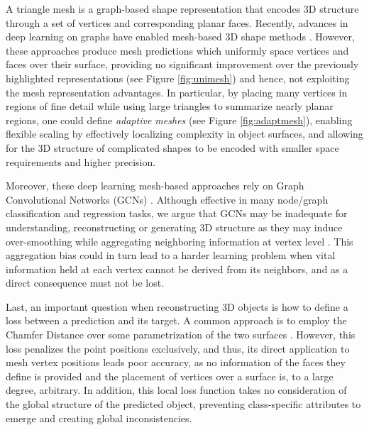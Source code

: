 \documentclass{article}
\begin{document}
A triangle mesh is a graph-based shape representation that encodes 3D structure through a set of vertices and corresponding planar faces. Recently, advances in deep learning on graphs have enabled mesh-based 3D shape methods \cite{kato2017neural, Pixel2Mesh, kanazawa2018learning, jack2018learning, henderson2018learning, groueix20183d}. However, these approaches produce mesh predictions which uniformly space vertices and faces over their surface, providing no significant improvement over the previously highlighted representations (see Figure \ref{fig:unimesh}) and hence, not exploiting the mesh representation advantages. In particular, by placing many vertices in regions of fine detail while using large triangles to summarize nearly planar regions, one could define \emph{adaptive meshes} (see Figure \ref{fig:adaptmesh}), enabling flexible scaling by effectively localizing complexity in object surfaces, and allowing for the 3D structure of complicated shapes to be encoded with smaller space requirements and higher precision.  


Moreover, these deep learning mesh-based approaches rely on Graph Convolutional Networks (GCNs) \cite{GCN,Defferrard:2016:CNN:3157382.3157527,Cucurull2018ConvolutionalNN,Pixel2Mesh}. Although effective in many node/graph classification and regression tasks, we argue that GCNs may be inadequate for understanding, reconstructing or generating 3D structure as they may induce over-smoothing while aggregating neighboring information at vertex level \cite{Li2018DeeperII}. This aggregation bias could in turn lead to a harder learning problem when vital information held at each vertex cannot be derived from its neighbors, and as a direct consequence must not be lost. 

Last, an important question when reconstructing 3D objects is how to define a loss between a prediction and its target. A common approach is to employ the Chamfer Distance over some parametrization of the two surfaces \cite{Barrow:1977:PCC:1622943.1622971, insafutdinov2018unsupervised,Pixel2Mesh, groueix2018atlasnet,pix3d,fan2017point}. However, this loss penalizes the point positions exclusively, and thus, its direct application to mesh vertex positions leads poor accuracy, as no information of the faces they define is provided and the placement of vertices over a surface is, to a large degree, arbitrary. In addition, this local loss function takes no consideration of the global structure of the predicted object, preventing class-specific attributes to emerge and creating global inconsistencies.
\end{document}
